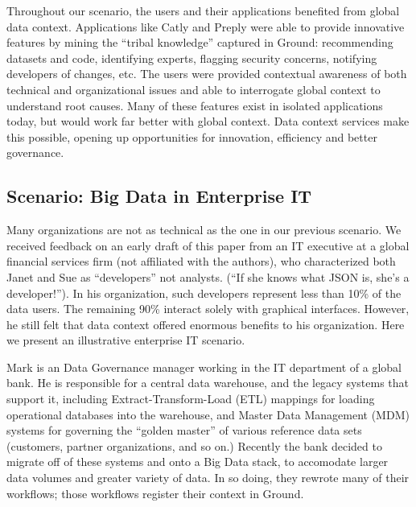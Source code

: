 \documentclass{sig-alternate}
\begin{document}
Throughout our scenario, the users and their applications benefited from global data context. 
Applications like Catly and Preply were able to provide innovative features by mining the ``tribal knowledge'' captured in Ground:
recommending datasets and code, identifying experts, flagging security concerns, notifying developers of changes, etc.
The users were provided contextual awareness of both technical and organizational issues and able to interrogate global context to understand root causes. 
Many of these features exist in isolated applications today, but would work far better with global context. 
Data context services make this possible, opening up opportunities for innovation, efficiency and better governance.

\subsection{Scenario: Big Data in Enterprise IT}
Many organizations are not as technical as the one in our previous scenario. We received feedback on an early draft of this paper from an IT executive at a global financial services firm (not affiliated with the authors), who characterized both Janet and Sue as ``developers'' not analysts. (``If she knows what JSON is, she's a developer!''). In his organization, such developers represent less than 10\% of the data users. The remaining 90\% interact solely with graphical interfaces. However, he still felt that data context offered enormous benefits to his organization. Here we present an illustrative enterprise IT scenario.

Mark is an Data Governance manager working in the IT department of a global bank. He is responsible for a central data warehouse, and the legacy systems that support it, including Extract-Transform-Load (ETL) mappings for loading operational databases into the warehouse, and Master Data Management (MDM) systems for governing the ``golden master'' of various reference data sets (customers, partner organizations, and so on.) Recently the bank decided to migrate off of these systems and onto a Big Data stack, to accomodate larger data volumes and greater variety of data. In so doing, they rewrote many of their workflows; those workflows register their context in Ground.
\end{document}
